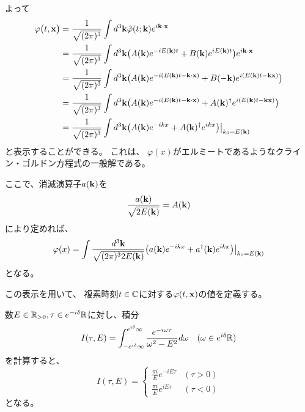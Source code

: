 よって
\begin{align*}
  \varphi\bigl(t,\mathbf{x}\bigr) &=
  \frac{1}{\sqrt{(2\pi)^3}}
  \int d^3\mathbf{k}\hat{\varphi}(t;\mathbf{k}) e^{i\mathbf{k}\cdot\mathbf{x}} \\ &=
  \frac{1}{\sqrt{(2\pi)^3}}
  \int d^3\mathbf{k}
  \bigl( A(\mathbf{k})e^{-iE(\mathbf{k})t}+B(\mathbf{k})e^{iE(\mathbf{k})t} \bigr)e^{i\mathbf{k}\cdot\mathbf{x}} \\ &=
  \frac{1}{\sqrt{(2\pi)^3}}
  \int d^3\mathbf{k}
  \bigl(
  A(\mathbf{k})e^{-i(E(\mathbf{k})t-\mathbf{k}\cdot\mathbf{x})}
  +B(-\mathbf{k})e^{i(E(\mathbf{k})t-\mathbf{k}\mathbf{x})}
  \bigr) \\ &=
  \frac{1}{\sqrt{(2\pi)^3}}
  \int d^3\mathbf{k}
  \bigl(
  A(\mathbf{k})e^{-i(E(\mathbf{k})t-\mathbf{k}\cdot\mathbf{x})}
  +A(\mathbf{k})^\dagger e^{i(E(\mathbf{k})t-\mathbf{k}\mathbf{x})}
  \bigr)
  \\ &=
 \frac{1}{\sqrt{(2\pi)^3}}
 \int d^3\mathbf{k}
 \bigl.\bigl(
 A(\mathbf{k})e^{-ikx}
 +A(\mathbf{k})^\dagger e^{ikx}
 \bigr)\bigr|_{k_0=E(\mathbf{k})}
\end{align*}
と表示することができる。
これは、
$\varphi(x)$がエルミートであるようなクライン・ゴルドン方程式の一般解である。

ここで、消滅演算子$a(\mathbf{k})$を
\begin{equation}
  \frac{a(\mathbf{k})}{\sqrt{2E(\mathbf{k})}}=A(\mathbf{k})
\end{equation}
により定めれば、
\begin{equation}
  \varphi(x) =
  \int
  \frac{d^3\mathbf{k}}{\sqrt{(2\pi)^3 2E(\mathbf{k})}}
  \bigl. \bigl(
    a(\mathbf{k})e^{-ikx}+a^\dagger(\mathbf{k})e^{ikx}
  \bigr) \bigr|_{k_0=E(\mathbf{k})}
\end{equation}
となる。

この表示を用いて、
複素時刻$t\in\mathbb{C}$に対する$\varphi(t,\mathbf{x})$の値を定義する。

\begin{thm}
  \label{thm-residue-energy-pole}
  数$E \in\mathbb{R}_{>0}, \tau\in e^{-i\delta}\mathbb{R}$に対し、積分
  \begin{equation}
    I(\tau,E)=\int_{-e^{i\delta}\infty}^{e^{i\delta}\infty}
    \frac{e^{-i\omega\tau}}{\omega^2-E^2}
    d\omega
    \quad
    (\omega\in e^{i\delta}\mathbb{R})
  \end{equation}
  を計算すると、
  \begin{equation}
    I(\tau,E)=
    \begin{cases}
      \frac{\pi i}{E} e^{-iE\tau} & (\tau > 0)\\
      \frac{\pi i}{E} e^{iE\tau} & (\tau < 0)
    \end{cases}
  \end{equation}
  となる。
\end{thm}

